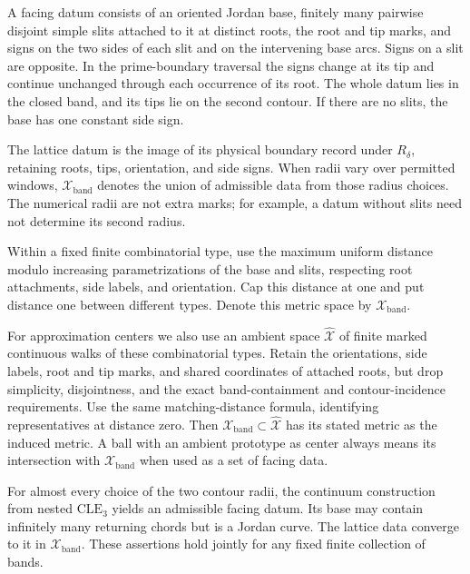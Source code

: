 \begin{definition}\label{if:datum}
A facing datum consists of an oriented Jordan base, finitely many
pairwise disjoint simple slits attached to it at distinct roots, the
root and tip marks, and signs on the two sides of each slit and on
the intervening base arcs.  Signs on a slit are opposite.  In the
prime-boundary traversal the signs change at its tip and continue
unchanged through each occurrence of its root.  The whole datum lies
in the closed band, and its tips lie on the second contour.  If there
are no slits, the base has one constant side sign.

The lattice datum is the image of its physical boundary record under
$R_\delta$, retaining roots, tips, orientation, and side signs.
When radii vary over permitted windows,
$\mathcal X_{\mathrm{band}}$ denotes the union of admissible data from
those radius choices. The numerical radii are not extra marks; for
example, a datum without slits need not determine its second radius.

Within a fixed finite combinatorial type, use the maximum uniform
distance modulo increasing parametrizations of the base and slits,
respecting root attachments, side labels, and orientation.  Cap this
distance at one and put distance one between different types.  Denote
this metric space by $\mathcal X_{\mathrm{band}}$.

For approximation centers we also use an ambient space
$\widehat{\mathcal X}$ of finite marked continuous walks of these
combinatorial types. Retain the orientations, side labels, root and tip
marks, and shared coordinates of attached roots, but drop simplicity,
disjointness, and the exact band-containment and contour-incidence
requirements. Use the same matching-distance formula, identifying
representatives at distance zero. Then
$\mathcal X_{\mathrm{band}}\subset\widehat{\mathcal X}$ has its
stated metric as the induced metric. A ball with an ambient prototype
as center always means its intersection with
$\mathcal X_{\mathrm{band}}$ when used as a set of facing data.
\end{definition}

\begin{lemma}\label{if:visible-data}
For almost every choice of the two contour radii, the continuum
construction from nested $\mathrm{CLE}_3$ yields an admissible facing
datum.  Its base may contain infinitely many returning chords but is
a Jordan curve.  The lattice data converge to it in
$\mathcal X_{\mathrm{band}}$.  These assertions hold jointly for any
fixed finite collection of bands.
\end{lemma}

